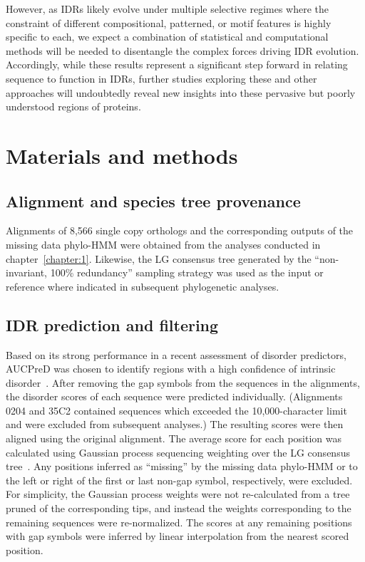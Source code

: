 However, as IDRs likely evolve under multiple selective regimes where the constraint of different compositional, patterned, or motif features is highly specific to each, we expect a combination of statistical and computational methods will be needed to disentangle the complex forces driving IDR evolution. Accordingly, while these results represent a significant step forward in relating sequence to function in IDRs, further studies exploring these and other approaches will undoubtedly reveal new insights into these pervasive but poorly understood regions of proteins.

\section{Materials and methods}
\subsection{Alignment and species tree provenance}
Alignments of 8,566 single copy orthologs and the corresponding outputs of the missing data phylo-HMM were obtained from the analyses conducted in chapter~\ref{chapter:1}. Likewise, the LG consensus tree generated by the ``non-invariant, 100\% redundancy'' sampling strategy was used as the input or reference where indicated in subsequent phylogenetic analyses.

\subsection{IDR prediction and filtering}
Based on its strong performance in a recent assessment of disorder predictors, AUCPreD was chosen to identify regions with a high confidence of intrinsic disorder~\cite{Wang2016, Necci2021}. After removing the gap symbols from the sequences in the alignments, the disorder scores of each sequence were predicted individually. (Alignments 0204 and 35C2 contained sequences which exceeded the 10,000-character limit and were excluded from subsequent analyses.) The resulting scores were then aligned using the original alignment. The average score for each position was calculated using Gaussian process sequencing weighting over the LG consensus tree~\cite{Altschul1989}. Any positions inferred as ``missing'' by the missing data phylo-HMM or to the left or right of the first or last non-gap symbol, respectively, were excluded. For simplicity, the Gaussian process weights were not re-calculated from a tree pruned of the corresponding tips, and instead the weights corresponding to the remaining sequences were re-normalized. The scores at any remaining positions with gap symbols were inferred by linear interpolation from the nearest scored position.

